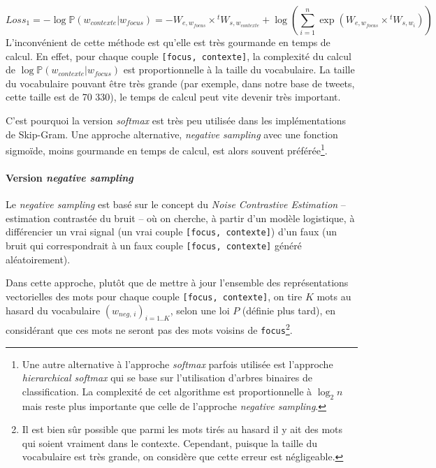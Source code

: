 \documentclass[11pt,french,french]{article}
\let\rmarkdownfootnote\footnote%
\def\footnote{\protect\rmarkdownfootnote}
\begin{document}
\[
Loss_{1}=-\log\mathbb P(w_{contexte}\vert w_{focus}) =
-W_{e,w_{focus}}\times {}^tW_{s,w_{contexte}}+
\log\left(\sum_{i=1}^n\exp(W_{e,w_{focus}}\times {}^t W_{s,w_i})\right)
\]
L'inconvénient de cette méthode est qu'elle est très gourmande en temps de calcul.
En effet, pour chaque couple \texttt{{[}focus,\ contexte{]}}, la complexité du calcul de \(\log\mathbb P(w_{contexte}\vert w_{focus})\) est proportionnelle à la taille du vocabulaire.
La taille du vocabulaire pouvant être très grande (par exemple, dans notre base de tweets, cette taille est de 70 330), le temps de calcul peut vite devenir très important.

C'est pourquoi la version \emph{softmax} est très peu utilisée dans les implémentations de Skip-Gram. Une approche alternative, \emph{negative sampling} avec une fonction sigmoïde, moins gourmande en temps de calcul, est alors souvent préférée\footnote{Une autre alternative à l'approche \emph{softmax} parfois utilisée est l'approche \emph{hierarchical softmax} qui se base sur l'utilisation d'arbres binaires de classification. La complexité de cet algorithme est proportionnelle à \(\log_2n\) mais reste plus importante que celle de l'approche \emph{negative sampling}.}.

\hypertarget{subsec:negsampling}{%
\paragraph{\texorpdfstring{Version \emph{negative sampling}}{Version negative sampling}}\label{subsec:negsampling}}

Le \emph{negative sampling} est basé sur le concept du \emph{Noise Contrastive Estimation} -- estimation contrastée du bruit -- où on cherche, à partir d'un modèle logistique, à différencier un vrai signal (un vrai couple \texttt{{[}focus,\ contexte{]}}) d'un faux (un bruit qui correspondrait à un faux couple \texttt{{[}focus,\ contexte{]}} généré aléatoirement).

Dans cette approche, plutôt que de mettre à jour l'ensemble des représentations vectorielles des mots pour chaque couple \texttt{{[}focus,\ contexte{]}}, on tire \(K\) mots au hasard du vocabulaire \((w_{neg,\,i})_{i=1..K}\), selon une loi \(P\) (définie plus tard), en considérant que ces mots ne seront pas des mots voisins de \texttt{focus}\footnote{Il est bien sûr possible que parmi les mots tirés au hasard il y ait des mots qui soient vraiment dans le contexte. Cependant, puisque la taille du vocabulaire est très grande, on considère que cette erreur est négligeable.}.
\end{document}
